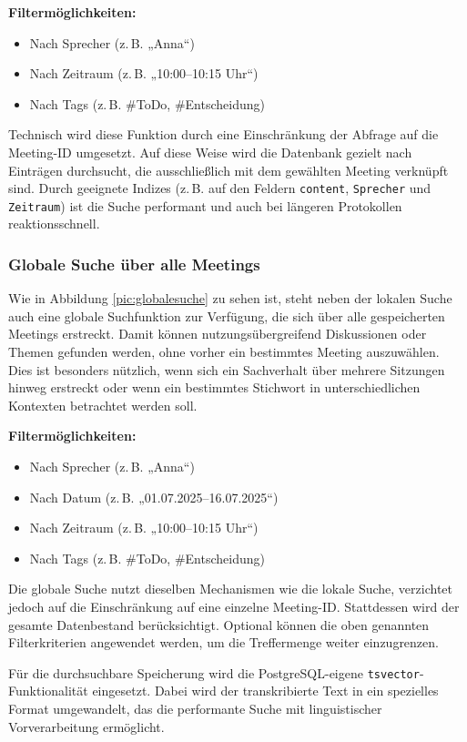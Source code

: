 \textbf{Filtermöglichkeiten:}
\begin{itemize}
  \item Nach Sprecher (z.\,B. „Anna“)
  \item Nach Zeitraum (z.\,B. „10:00--10:15 Uhr“)
  \item Nach Tags (z.\,B. \#ToDo, \#Entscheidung)
\end{itemize}

Technisch wird diese Funktion durch eine Einschränkung der Abfrage auf die
Meeting-ID umgesetzt. Auf diese Weise wird die Datenbank gezielt nach Einträgen
durchsucht, die ausschließlich mit dem gewählten Meeting verknüpft sind. Durch
geeignete Indizes (z.\,B. auf den Feldern \texttt{content}, \texttt{Sprecher}
und \texttt{Zeitraum}) ist die Suche performant und auch bei längeren
Protokollen reaktionsschnell.

\subsubsection*{Globale Suche über alle Meetings}
\label{sub:globalesuche}
Wie in Abbildung \autoref{pic:globalesuche} zu sehen ist, steht neben der lokalen
Suche auch eine globale Suchfunktion zur Verfügung, die sich über alle
gespeicherten Meetings erstreckt. Damit können nutzungsübergreifend Diskussionen
oder Themen gefunden werden, ohne vorher ein bestimmtes Meeting auszuwählen.
Dies ist besonders nützlich, wenn sich ein Sachverhalt über mehrere Sitzungen
hinweg erstreckt oder wenn ein bestimmtes Stichwort in unterschiedlichen
Kontexten betrachtet werden soll.

\textbf{Filtermöglichkeiten:}
\begin{itemize}
  \item Nach Sprecher (z.\,B. „Anna“)
  \item Nach Datum (z.\,B. „01.07.2025--16.07.2025“)
  \item Nach Zeitraum (z.\,B. „10:00--10:15 Uhr“)
  \item Nach Tags (z.\,B. \#ToDo, \#Entscheidung)
\end{itemize}

Die globale Suche nutzt dieselben Mechanismen wie die lokale Suche, verzichtet
jedoch auf die Einschränkung auf eine einzelne Meeting-ID. Stattdessen wird der
gesamte Datenbestand berücksichtigt. Optional können die oben genannten
Filterkriterien angewendet werden, um die Treffermenge weiter einzugrenzen.

Für die durchsuchbare Speicherung wird die PostgreSQL-eigene \texttt{tsvector}-Funktionalität eingesetzt. Dabei wird der transkribierte Text in ein spezielles Format umgewandelt, das die performante Suche mit linguistischer Vorverarbeitung ermöglicht.

